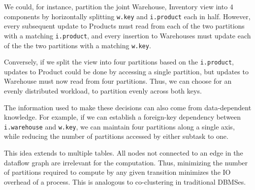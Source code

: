 We could, for instance, partition the joint Warehouse, Inventory view into 4 components by horizontally splitting \texttt{w.key} and \texttt{i.product} each in half.  However, every subsequent update to Products must read from each of the two partitions with a matching \texttt{i.product}, and every insertion to Warehouses must update each of the the two partitions with a matching \texttt{w.key}.  

Conversely, if we split the view into four partitions based on the \texttt{i.product}, updates to Product could be done by accessing a single partition, but updates to Warehouse must now read from four partitions.  Thus, we can choose for an evenly distributed workload, to partition evenly across both keys.

The information used to make these decisions can also come from data-dependent knowledge.  For example, if we can establish a foreign-key dependency between \texttt{i.warehouse} and \texttt{w.key}, we can maintain four partitions along a single axis, while reducing the number of partitions accessed by either subtask to one.

This idea extends to multiple tables.  All nodes not connected to an edge in the dataflow graph are irrelevant for the computation.  Thus, minimizing the number of partitions required to compute by any given transition minimizes the IO overhead of a process.  This is analogous to co-clustering in traditional DBMSes.

